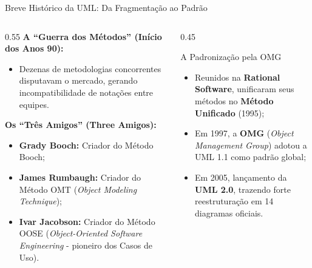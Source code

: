 \documentclass[10pt]{beamer}
\begin{document}
\begin{frame}{Breve Histórico da UML: Da Fragmentação ao Padrão}
    \begin{columns}
        \begin{column}{0.55\textwidth}
            \textbf{A ``Guerra dos Métodos'' (Início dos Anos 90):}
            \begin{itemize}
                \item Dezenas de metodologias concorrentes disputavam o mercado, gerando incompatibilidade de notações entre equipes.
            \end{itemize}
            \vspace{0.2cm}
            \textbf{Os ``Três Amigos'' (Three Amigos):}
            \begin{itemize}
                \item \textbf{Grady Booch:} Criador do Método Booch;
                \item \textbf{James Rumbaugh:} Criador do Método OMT (\textit{Object Modeling Technique});
                \item \textbf{Ivar Jacobson:} Criador do Método OOSE (\textit{Object-Oriented Software Engineering} - pioneiro dos Casos de Uso).
            \end{itemize}
        \end{column}
        \begin{column}{0.45\textwidth}
            \begin{block}{A Padronização pela OMG}
                \begin{itemize}
                    \item Reunidos na \textbf{Rational Software}, unificaram seus métodos no \textbf{Método Unificado} (1995);
                    \item Em 1997, a \textbf{OMG} (\textit{Object Management Group}) adotou a UML 1.1 como padrão global;
                    \item Em 2005, lançamento da \textbf{UML 2.0}, trazendo forte reestruturação em 14 diagramas oficiais.
                \end{itemize}
            \end{block}
        \end{column}
    \end{columns}
\end{frame}
\end{document}
